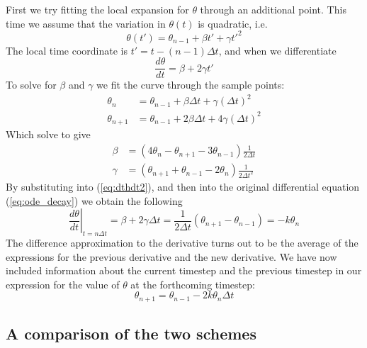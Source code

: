 \documentclass[10pt]{article}
\begin{document}
	First we try fitting the local expansion for $\theta$ through an
	additional point.	 This time we assume that the variation in $\theta(t)$ is quadratic, i.e.
	 	\begin{equation}
	 		\theta(t') = \theta_{n-1} + \beta t' + \gamma {t'}^2
	 	\end{equation}	
	 The local time coordinate is $t' = t - (n-1)\Delta t$, and when
	 we differentiate
	 	\begin{equation}
	 		\frac{d \theta}{dt} = \beta + 2 \gamma t'
	 		\label{eq:dthdt2}
	 	\end{equation}	
	 To solve for $\beta$ and $\gamma$ we fit the curve through
	 the sample points:
	 	\begin{equation}
	 		\begin{split}
	 			\theta_n &= \theta_{n-1} + \beta \Delta t + \gamma (\Delta t)^2 \\
				\theta_{n+1} &= \theta_{n-1} + 2 \beta \Delta t + 4 \gamma (\Delta t)^2
	 		\end{split}
	 	\end{equation}	
	Which solve to give
		 \begin{equation}
		 	\begin{split}
	 			\beta &= \left( 4 \theta_n - \theta_{n+1} - 3\theta_{n-1} \right) \frac{1}{2\Delta t} \\
	 			\gamma &= \left( \theta_{n+1} + \theta_{n-1} -2 \theta_n \right) \frac{1}{2\Delta t^2} 
	 		\end{split}
	 	\end{equation}
	 By substituting into (\ref{eq:dthdt2}), and then into the
	 original differential equation (\ref{eq:ode_decay}) we obtain the following
	 	\begin{equation}	 	
	 			\left. \frac{d\theta}{dt} \right|_{t=n\Delta t} = \beta + 2\gamma \Delta t =
	 				\frac{1}{2\Delta t} \left( \theta_{n+1} - \theta_{n-1} \right)  = -k \theta_n 
	 	\end{equation}
	The difference approximation to the derivative turns out to be the average of the expressions for the
	previous derivative and the new derivative. We have now included information about the current timestep
	and the previous timestep in our expression for the value of $\theta$ at the forthcoming timestep:	
		\begin{equation}
				 \theta_{n+1} = \theta_{n-1} -2k \theta_n \Delta t
		\end{equation}
	
	\subsection{A comparison of the two schemes}
	
\end{document}
